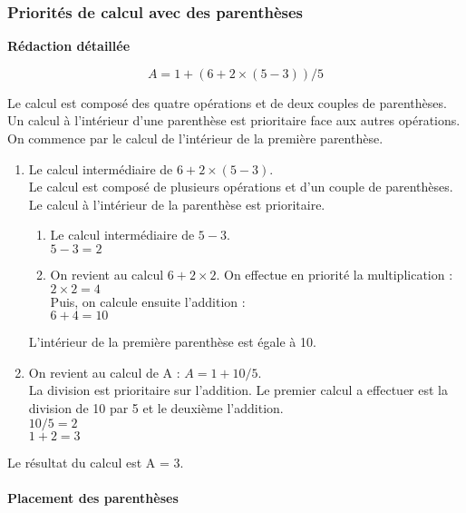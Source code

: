 \documentclass[11pt]{article}
\begin{document}
\subsubsection{Priorités de calcul avec des parenthèses}

\textbf{Rédaction détaillée}

$$A = 1 + (6 + 2 \times (5 - 3))/5 $$

Le calcul est composé des quatre opérations et de deux couples de parenthèses. Un calcul à l'intérieur d'une parenthèse est prioritaire face aux autres opérations. On commence par le calcul de l'intérieur de la première parenthèse.
\begin{enumerate}
\item Le calcul intermédiaire de  $6 + 2 \times (5 - 3)$.\\
  Le calcul est composé de plusieurs opérations et d'un couple de parenthèses. Le calcul à l'intérieur de la parenthèse est prioritaire.
  
  \begin{enumerate}
  \item Le calcul intermédiaire de  $5 - 3$.\\
    $5 - 3 = 2$\\
  \item On revient au calcul $6 + 2 \times 2$.
    On effectue en priorité la multiplication :\\
    $2 \times 2 = 4$\\
    Puis, on calcule ensuite l'addition :\\
    $6 + 4 = 10$
  \end{enumerate}
  L'intérieur de la première parenthèse est égale à 10.

\item On revient au calcul de A : $A =  1 + 10/5$.\\
  La division est prioritaire sur l'addition. Le premier calcul a effectuer est la division de 10 par 5 et le deuxième l'addition.\\
  $10/5 = 2$\\
  $1 + 2 = 3$
\end{enumerate}
Le résultat du calcul est A = 3.\\

\paragraph{Placement des parenthèses}~~\\
\end{document}
